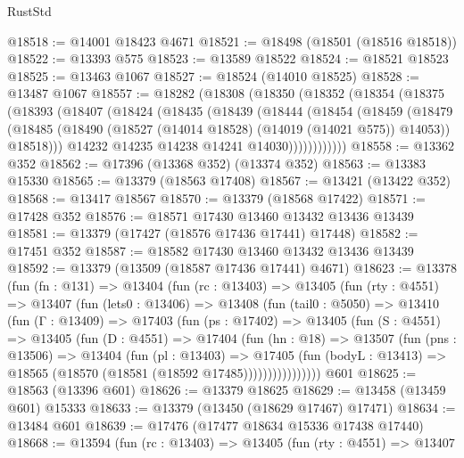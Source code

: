 \begin{lexlean}{RustStd}
\begin{coremodule}
@18518 := @14001 @18423 @4671
@18521 := @18498 (@18501 (@18516 @18518))
@18522 := @13393 @575
@18523 := @13589 @18522
@18524 := @18521 @18523
@18525 := @13463 @1067
@18527 := @18524 (@14010 @18525)
@18528 := @13487 @1067
@18557 := @18282
    (@18308
      (@18350
        (@18352
          (@18354
            (@18375
              (@18393
                (@18407
                  (@18424
                    (@18435
                      (@18439
                        (@18444
                          (@18454
                            (@18459
                              (@18479
                                (@18485
                                  (@18490 (@18527 (@14014 @18528) (@14019 (@14021 @575)) @14053))
                                  @18518)))
                            @14232
                            @14235
                            @14238
                            @14241
                            @14030))))))))))))
@18558 := @13362 @352
@18562 := @17396 (@13368 @352) (@13374 @352)
@18563 := @13383 @15330
@18565 := @13379 (@18563 @17408)
@18567 := @13421 (@13422 @352)
@18568 := @13417 @18567
@18570 := @13379 (@18568 @17422)
@18571 := @17428 @352
@18576 := @18571 @17430 @13460 @13432 @13436 @13439
@18581 := @13379 (@17427 (@18576 @17436 @17441) @17448)
@18582 := @17451 @352
@18587 := @18582 @17430 @13460 @13432 @13436 @13439
@18592 := @13379 (@13509 (@18587 @17436 @17441) @4671)
@18623 := @13378
    (fun (fn : @131) =>
    @13404
      (fun (rc : @13403) =>
      @13405
        (fun (rty : @4551) =>
        @13407
          (fun (lets0 : @13406) =>
          @13408
            (fun (tail0 : @5050) =>
            @13410
              (fun (Γ : @13409) =>
              @17403
                (fun (ps : @17402) =>
                @13405
                  (fun (S : @4551) =>
                  @13405
                    (fun (D : @4551) =>
                    @17404
                      (fun (hn : @18) =>
                      @13507
                        (fun (pns : @13506) =>
                        @13404
                          (fun (pl : @13403) =>
                          @17405
                            (fun (bodyL : @13413) =>
                            @18565 (@18570 (@18581 (@18592 @17485))))))))))))))))
    @601
@18625 := @18563 (@13396 @601)
@18626 := @13379 @18625
@18629 := @13458 (@13459 @601) @15333
@18633 := @13379 (@13450 (@18629 @17467) @17471)
@18634 := @13484 @601
@18639 := @17476 (@17477 @18634 @15336 @17438 @17440)
@18668 := @13594
    (fun (rc : @13403) =>
    @13405
      (fun (rty : @4551) =>
      @13407

\end{coremodule}
\end{lexlean}
